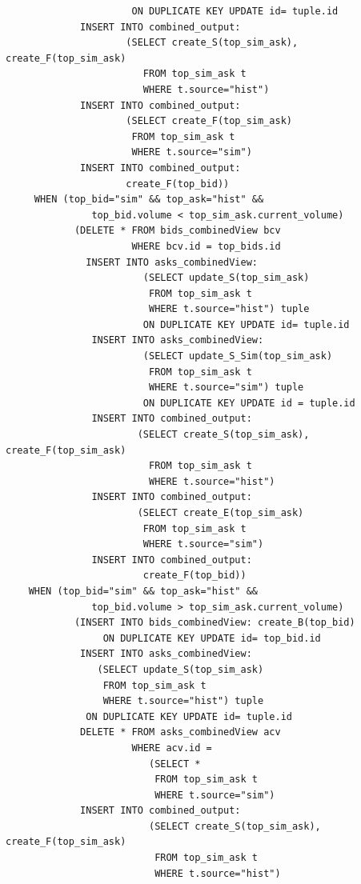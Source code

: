 \documentclass{article}
\begin{document}
\begin{verbatim}
                      ON DUPLICATE KEY UPDATE id= tuple.id
             INSERT INTO combined_output:
                     (SELECT create_S(top_sim_ask), create_F(top_sim_ask)
                        FROM top_sim_ask t
                        WHERE t.source="hist")
             INSERT INTO combined_output:
                     (SELECT create_F(top_sim_ask)
                      FROM top_sim_ask t
                      WHERE t.source="sim")
             INSERT INTO combined_output:
                     create_F(top_bid))
     WHEN (top_bid="sim" && top_ask="hist" &&
               top_bid.volume < top_sim_ask.current_volume)
            (DELETE * FROM bids_combinedView bcv
                      WHERE bcv.id = top_bids.id 
              INSERT INTO asks_combinedView: 
                        (SELECT update_S(top_sim_ask)
                         FROM top_sim_ask t
                         WHERE t.source="hist") tuple
                        ON DUPLICATE KEY UPDATE id= tuple.id
               INSERT INTO asks_combinedView:
                        (SELECT update_S_Sim(top_sim_ask)
                         FROM top_sim_ask t
                         WHERE t.source="sim") tuple
                        ON DUPLICATE KEY UPDATE id = tuple.id
               INSERT INTO combined_output:
                       (SELECT create_S(top_sim_ask), create_F(top_sim_ask)
                         FROM top_sim_ask t
                         WHERE t.source="hist")
               INSERT INTO combined_output:
                       (SELECT create_E(top_sim_ask)
                        FROM top_sim_ask t
                        WHERE t.source="sim")
               INSERT INTO combined_output:
                        create_F(top_bid))
    WHEN (top_bid="sim" && top_ask="hist" &&
               top_bid.volume > top_sim_ask.current_volume)
            (INSERT INTO bids_combinedView: create_B(top_bid)
                 ON DUPLICATE KEY UPDATE id= top_bid.id
             INSERT INTO asks_combinedView: 
                (SELECT update_S(top_sim_ask)
                 FROM top_sim_ask t
                 WHERE t.source="hist") tuple
              ON DUPLICATE KEY UPDATE id= tuple.id
             DELETE * FROM asks_combinedView acv
                      WHERE acv.id = 
                         (SELECT *
                          FROM top_sim_ask t
                          WHERE t.source="sim")
             INSERT INTO combined_output:
                         (SELECT create_S(top_sim_ask), create_F(top_sim_ask)
                          FROM top_sim_ask t
                          WHERE t.source="hist")

\end{verbatim}
\end{document}
